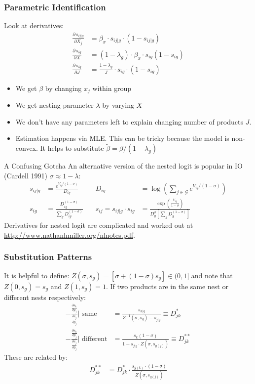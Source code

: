 \documentclass[xcolor=pdftex,dvipsnames,table,mathserif,aspectratio=169]{beamer}
\begin{document}
\begin{frame}
\frametitle{Parametric Identification}
Look at derivatives:
\begin{align*}
\frac{\partial\, s_{ij|g}}{\partial X_j} &= \beta_x \cdot s_{ij|g} \cdot (1-s_{ij|g}) \\
 \frac{\partial\, s_{ig}}{\partial X} &= (1-\lambda_g) \cdot \beta_x \cdot s_{ig}(1-s_{ig}) \\
  \frac{\partial\, s_{ig}}{\partial J} &= \frac{1-\lambda_g}{J} \cdot s_{ig} \cdot (1-s_{ig})
\end{align*}
\begin{itemize}
\item We get $\beta$ by changing $x_j$ within group
\item We get nesting parameter $\lambda$ by varying $X$
\item We don't have any parameters left to explain changing number of products $J$.
\item Estimation happens via MLE. This can be tricky because the model is non-convex. It helps to substitute $\tilde{\beta} = \beta/(1-\lambda_g)$
\end{itemize}
\end{frame}

\begin{frame}{A Confusing Gotcha}
An alternative version of the nested logit is popular in IO (Cardell 1991) $\sigma \approx 1-\lambda$:
\begin{align*}
s_{ij | g}&=\frac{e^{V_{ij}/(1-\sigma)}}{D_{ig}}  \quad &
D_{ig}&= \log \left( \sum_{j \in \mathcal{G}} e^{V_{ij}/(1-\sigma)} \right)  \\
s_{ig}&=\frac{D_{ig}^{(1-\sigma)}}{\sum_{g} D_{ig}^{(1-\sigma)}} \quad &
s_{ij}=  s_{ij | g}\cdot s_{ig } &=\frac{\exp \left(\frac{V_{ij}}{1-\sigma}\right)}{D_{g}^{\sigma}\left[\sum_{g} D_{g}^{(1-\sigma)}\right]}
\end{align*}
Derivatives for nested logit are complicated and worked out at \url{http://www.nathanhmiller.org/nlnotes.pdf}.
\end{frame}

\begin{frame}
\frametitle{Substitution Patterns}
It is helpful to define: $Z(\sigma,s_g)=[\sigma + (1-\sigma) s_g ] \in (0,1]$ and note that $Z(0,s_g)=s_g$ and $Z(1,s_g)=1$. If two products are in the same nest or different nests respectively:
\begin{align*}
 -\frac{\frac{\partial s_{k}}{\partial p_j}}{\frac{\partial s_{j}}{\partial p_j} } \text{| same}
&=\frac{ s_{k|g} }{ Z^{-1}(\sigma,s_g) - s_{j|g}}  \equiv D_{jk}^{*}\\
 -\frac{\frac{\partial s_{k}}{\partial p_j}}{\frac{\partial s_{j}}{\partial p_j} } \text{| different}
&= \frac{ s_{k}  (1-\sigma) }{ 1 - s_{j|g} \cdot Z(\sigma,s_{g(j)}) } \equiv D_{jk}^{**}
\end{align*}
These are related by:
\begin{align*}
D_{jk}^{**}&=  D_{jk}^{*} \cdot \frac{s_{g(k)} \cdot (1-\sigma)}{Z(\sigma,s_{g(j)})}
\end{align*}
\end{frame}
\end{document}
